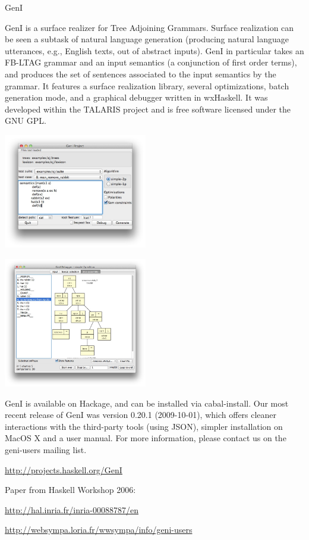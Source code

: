 \begin{hcarentry}[updated]{GenI}
\label{geni}
\makeheader

GenI is a surface realizer for Tree Adjoining Grammars.  Surface
realization can be seen a subtask of natural language generation
(producing natural language utterances, e.g., English texts, out of
abstract inputs).  GenI in particular takes an FB-LTAG grammar and an
input semantics (a conjunction of first order terms), and produces the
set of sentences associated to the input semantics by the grammar.  It
features a surface realization library, several optimizations, batch
generation mode, and a graphical debugger written in wxHaskell.  It was
developed within the TALARIS project and is free software licensed under
the GNU GPL.

\begin{center}
\includegraphics[width=0.47\textwidth]{html/GenI-main-screenshot.jpg}
\end{center}

\begin{center}
\includegraphics[width=0.47\textwidth]{html/GenI-debugger-screenshot.jpg}
\end{center}

GenI is available on Hackage, and can be installed via cabal-install.
Our most recent release of GenI was version 0.20.1 (2009-10-01), which
offers cleaner interactions with the third-party tools (using JSON),
simpler installation on MacOS X and a user manual.  For more
information, please contact us on the geni-users mailing list.

\FurtherReading
\begin{compactitem}
\item \url{http://projects.haskell.org/GenI}
\item Paper from Haskell Workshop 2006:

\url{http://hal.inria.fr/inria-00088787/en}
\item \url{http://websympa.loria.fr/wwsympa/info/geni-users}
\end{compactitem}
\end{hcarentry}
